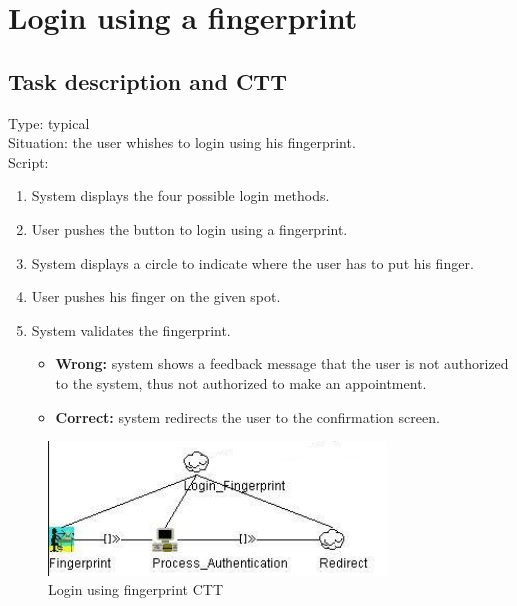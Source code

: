\documentclass[11pt, a4paper,svglistings]{report}
\begin{document}

\newpage

\section{\label{subsec:loginFinger}Login using a fingerprint}

\subsection{Task description and CTT}

Type: typical \\
Situation: the user whishes to login using his fingerprint. \\
Script:
\begin{enumerate}
\item System displays the four possible login methods.
\item User pushes the button to login using a fingerprint.
\item System displays a circle to indicate where the user has to put his finger.
\item User pushes his finger on the given spot.
\item System validates the fingerprint.
\begin{itemize}
\item \textbf{Wrong:} system shows a feedback message that the user is not authorized to the system, thus not authorized to make an appointment.
\item \textbf{Correct:} system redirects the user to the  confirmation screen.
\end{itemize}
\end{enumerate}

\begin{figure}[H]
\centering
    \includegraphics[width=0.8\textwidth]{LoginFingerprint.png}
  \caption[Fingerprint CTT]{\label{fig:Logout}Login using fingerprint CTT}
\end{figure}
\end{document}
